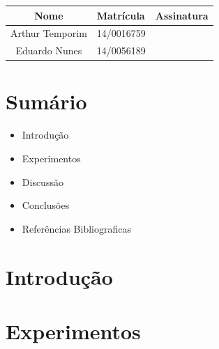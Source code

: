 \documentclass[12pts]{article}
\date{Outubro 04, 2016}
\begin{document}
\maketitle	
\begin{center}

\begin{tabular}{|c|l|r|}
\hline
Nome & Matrícula & Assinatura\\
\hline

Arthur Temporim & 14/0016759 & \\
\hline	
Eduardo Nunes & 14/0056189 & \\

\hline	
\end{tabular}

\end{center}


\newpage

\section{Sumário}

\begin{itemize}
	\item Introdução
	\singlespacing
	\item Experimentos
	\singlespacing
	\item Discussão
	\singlespacing
	\item Conclusões 
	\singlespacing
	\item Referências Bibliograficas
	\singlespacing
\end{itemize}

\newpage


\section{Introdução}

\section{Experimentos}

\end{document}
